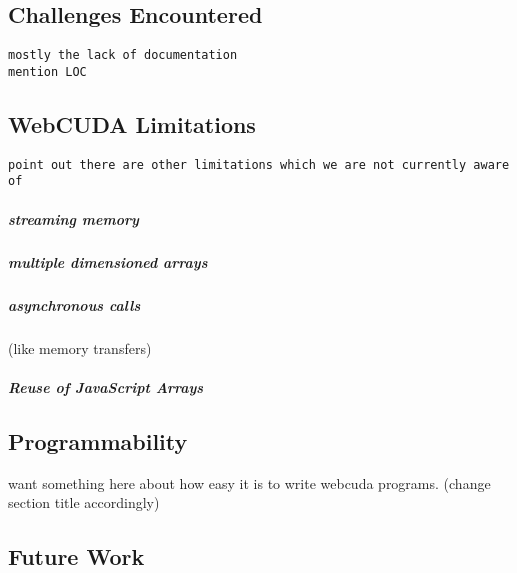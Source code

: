 
\subsection{Challenges Encountered}
\begin{verbatim}
mostly the lack of documentation
mention LOC
\end{verbatim}

\subsection{WebCUDA Limitations}
\begin{verbatim}
point out there are other limitations which we are not currently aware of
\end{verbatim}
\subparagraph{streaming memory}
\subparagraph{multiple dimensioned arrays}
\subparagraph{asynchronous calls} (like memory transfers)
\subparagraph{Reuse of JavaScript Arrays}

\subsection{Programmability}
want something here about how easy it is to write webcuda programs. (change section title accordingly)

\subsection{Future Work}
